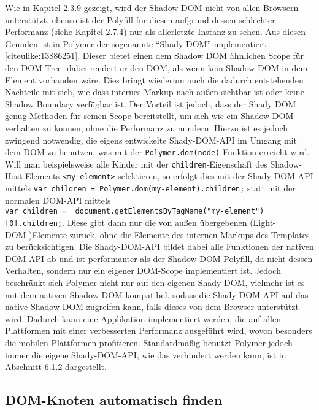 Wie in Kapitel 2.3.9 gezeigt, wird der Shadow DOM nicht von allen
Browsern unterstützt, ebenso ist der Polyfill für diesen aufgrund dessen
schlechter Performanz (siehe Kapitel 2.7.4) nur als allerletzte Instanz
zu sehen. Aus diesen Gründen ist in Polymer der sogenannte ``Shady DOM''
implementiert {[}citeulike:13886251{]}. Dieser bietet einen dem Shadow
DOM ähnlichen Scope für den DOM-Tree. dabei rendert er den DOM, als wenn
kein Shadow DOM in dem Element vorhanden wäre. Dies bringt wiederum auch
die dadurch entstehenden Nachteile mit sich, wie dass internes Markup
nach außen sichtbar ist oder keine Shadow Boundary verfügbar ist. Der
Vorteil ist jedoch, dass der Shady DOM genug Methoden für seinen Scope
bereitstellt, um sich wie ein Shadow DOM verhalten zu können, ohne die
Performanz zu mindern. Hierzu ist es jedoch zwingend notwendig, die
eigens entwickelte Shady-DOM-API im Umgang mit dem DOM zu benutzen, was
mit der \texttt{Polymer.dom(node)}-Funktion erreicht wird. Will man
beispielsweise alle Kinder mit der \texttt{children}-Eigenschaft des
Shadow-Host-Elements \texttt{\textless{}my-element\textgreater{}}
selektieren, so erfolgt dies mit der Shady-DOM-API mittels
\texttt{var\ children\ =\ Polymer.dom(my-element).children;} statt mit
der normalen DOM-API mittels
\texttt{var\ children\ =\ \ document.getElementsByTagName("my-element"){[}0{]}.children;}.
Diese gibt dann nur die von außen übergebenen (Light-DOM-)Elemente
zurück, ohne die Elemente des internen Markups des Templates zu
berücksichtigen. Die Shady-DOM-API bildet dabei alle Funktionen der
nativen DOM-API ab und ist performanter als der Shadow-DOM-Polyfill, da
nicht dessen Verhalten, sondern nur ein eigener DOM-Scope implementiert
ist. Jedoch beschränkt sich Polymer nicht nur auf den eigenen Shady DOM,
vielmehr ist es mit dem nativen Shadow DOM kompatibel, sodass die
Shady-DOM-API auf das native Shadow DOM zugreifen kann, falls dieses von
dem Browser unterstützt wird. Dadurch kann eine Applikation
implementiert werden, die auf allen Plattformen mit einer verbesserten
Performanz ausgeführt wird, wovon besonders die mobilen Plattformen
profitieren. Standardmäßig benutzt Polymer jedoch immer die eigene
Shady-DOM-API, wie das verhindert werden kann, ist in Abschnitt 6.1.2
dargestellt.

\subsection{DOM-Knoten automatisch
finden}\label{dom-knoten-automatisch-finden}

